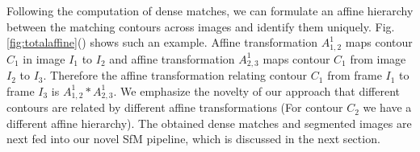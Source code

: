 Following the computation of dense matches, we can formulate an affine hierarchy between the matching contours across images and identify them uniquely. Fig.\ref{fig:totalaffine}() shows such an example. Affine transformation $A_{1,2}^1$ maps contour $C_1$ in image $I_1$ to $I_2$ and affine transformation $A_{2,3}^1$ maps contour $C_1$ from image $I_2$ to $I_3$. Therefore the affine transformation relating contour $C_1$ from frame $I_1$ to frame $I_3$ is $A_{1,2}^1 * A_{2,3}^1$. We emphasize the novelty of our approach that different contours are related by different affine transformations (For contour $C_2$ we have a different affine hierarchy). The obtained dense matches and segmented images are next fed into our novel SfM pipeline, which is discussed in the next section.




